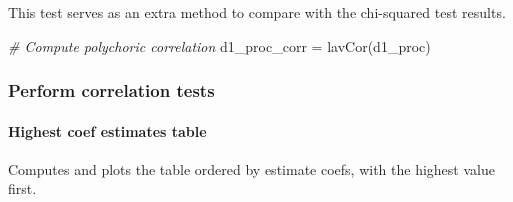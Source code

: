 \documentclass[
]{article}
\newenvironment{Shaded}{\begin{snugshade}}{\end{snugshade}}
\newcommand{\AttributeTok}[1]{\textcolor[rgb]{0.77,0.63,0.00}{#1}}
\newcommand{\CommentTok}[1]{\textcolor[rgb]{0.56,0.35,0.01}{\textit{#1}}}
\newcommand{\ConstantTok}[1]{\textcolor[rgb]{0.00,0.00,0.00}{#1}}
\newcommand{\DecValTok}[1]{\textcolor[rgb]{0.00,0.00,0.81}{#1}}
\newcommand{\FunctionTok}[1]{\textcolor[rgb]{0.00,0.00,0.00}{#1}}
\newcommand{\NormalTok}[1]{#1}
\newcommand{\OtherTok}[1]{\textcolor[rgb]{0.56,0.35,0.01}{#1}}
\newcommand{\SpecialCharTok}[1]{\textcolor[rgb]{0.00,0.00,0.00}{#1}}
\newcommand{\StringTok}[1]{\textcolor[rgb]{0.31,0.60,0.02}{#1}}
\begin{document}
This test serves as an extra method to compare with the chi-squared test
results.

\begin{Shaded}
\begin{Highlighting}[]
\CommentTok{\# Compute polychoric correlation}
\NormalTok{d1\_proc\_corr }\OtherTok{=} \FunctionTok{lavCor}\NormalTok{(d1\_proc)}
\end{Highlighting}
\end{Shaded}

\hypertarget{perform-correlation-tests}{%
\subsubsection{Perform correlation
tests}\label{perform-correlation-tests}}

\hypertarget{highest-coef-estimates-table}{%
\paragraph{Highest coef estimates
table}\label{highest-coef-estimates-table}}

Computes and plots the table ordered by estimate coefs, with the highest
value first.

\begin{Shaded}
\end{Shaded}
\end{document}
